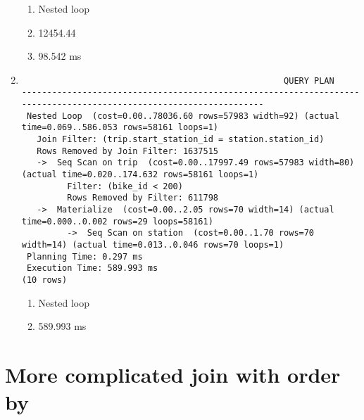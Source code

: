 \documentclass{homework}
\begin{document}
\begin{enumerate}
    \begin{enumerate}
        \item Nested loop
        \item 12454.44
        \item 98.542 ms
    \end{enumerate}

    \item
    \begin{verbatim}
                                                    QUERY PLAN
-------------------------------------------------------------------------------------------------------------------
 Nested Loop  (cost=0.00..78036.60 rows=57983 width=92) (actual time=0.069..586.053 rows=58161 loops=1)
   Join Filter: (trip.start_station_id = station.station_id)
   Rows Removed by Join Filter: 1637515
   ->  Seq Scan on trip  (cost=0.00..17997.49 rows=57983 width=80) (actual time=0.020..174.632 rows=58161 loops=1)
         Filter: (bike_id < 200)
         Rows Removed by Filter: 611798
   ->  Materialize  (cost=0.00..2.05 rows=70 width=14) (actual time=0.000..0.002 rows=29 loops=58161)
         ->  Seq Scan on station  (cost=0.00..1.70 rows=70 width=14) (actual time=0.013..0.046 rows=70 loops=1)
 Planning Time: 0.297 ms
 Execution Time: 589.993 ms
(10 rows)
\end{verbatim}

    \begin{enumerate}
        \item Nested loop
        \item 589.993 ms
    \end{enumerate}
\end{enumerate}

\section{More complicated join with order by}
\end{document}
